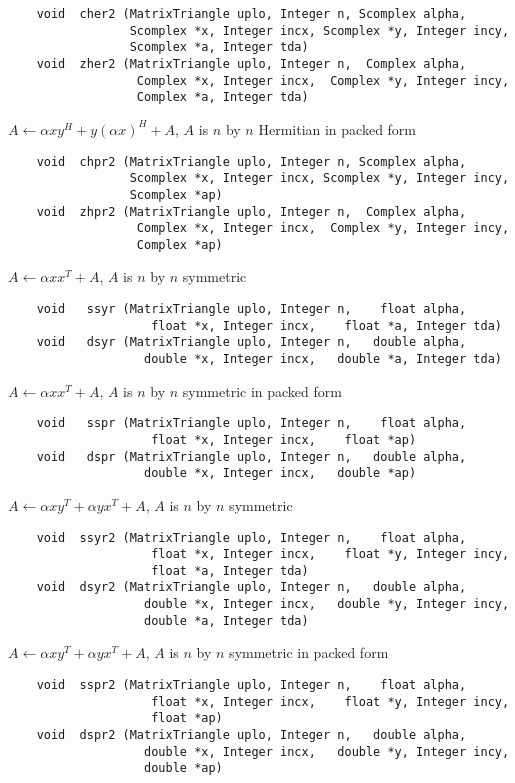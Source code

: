 \footnotesize
\begin{verbatim}
    void  cher2 (MatrixTriangle uplo, Integer n, Scomplex alpha,
                 Scomplex *x, Integer incx, Scomplex *y, Integer incy,
                 Scomplex *a, Integer tda)
    void  zher2 (MatrixTriangle uplo, Integer n,  Complex alpha,
                  Complex *x, Integer incx,  Complex *y, Integer incy,
                  Complex *a, Integer tda)
\end{verbatim}
\normalsize
$A \leftarrow \alpha xy^H + y(\alpha x)^H + A$,
$A$ is $n$ by $n$ Hermitian in packed form
\footnotesize
\begin{verbatim}
    void  chpr2 (MatrixTriangle uplo, Integer n, Scomplex alpha,
                 Scomplex *x, Integer incx, Scomplex *y, Integer incy,
                 Scomplex *ap)
    void  zhpr2 (MatrixTriangle uplo, Integer n,  Complex alpha,
                  Complex *x, Integer incx,  Complex *y, Integer incy,
                  Complex *ap)
\end{verbatim}
\normalsize
$A \leftarrow \alpha xx^T +A$, $A$ is $n$ by $n$ symmetric
\footnotesize
\begin{verbatim}
    void   ssyr (MatrixTriangle uplo, Integer n,    float alpha,
                    float *x, Integer incx,    float *a, Integer tda)
    void   dsyr (MatrixTriangle uplo, Integer n,   double alpha,
                   double *x, Integer incx,   double *a, Integer tda)
\end{verbatim}
\normalsize
$A \leftarrow \alpha xx^T + A$, $A$ is $n$ by $n$ symmetric in
packed form
\footnotesize
\begin{verbatim}
    void   sspr (MatrixTriangle uplo, Integer n,    float alpha,
                    float *x, Integer incx,    float *ap)
    void   dspr (MatrixTriangle uplo, Integer n,   double alpha,
                   double *x, Integer incx,   double *ap) 
\end{verbatim}
\normalsize
$A \leftarrow \alpha xy^T + \alpha yx^T + A$,
$A$ is $n$ by $n$ symmetric
\footnotesize
\begin{verbatim}
    void  ssyr2 (MatrixTriangle uplo, Integer n,    float alpha,
                    float *x, Integer incx,    float *y, Integer incy,
                    float *a, Integer tda)
    void  dsyr2 (MatrixTriangle uplo, Integer n,   double alpha,
                   double *x, Integer incx,   double *y, Integer incy,
                   double *a, Integer tda) 
\end{verbatim}
\normalsize
$A \leftarrow \alpha xy^T + \alpha yx^T + A$,
$A$ is $n$ by $n$ symmetric in packed form
\footnotesize
\begin{verbatim}
    void  sspr2 (MatrixTriangle uplo, Integer n,    float alpha,
                    float *x, Integer incx,    float *y, Integer incy,
                    float *ap)
    void  dspr2 (MatrixTriangle uplo, Integer n,   double alpha,
                   double *x, Integer incx,   double *y, Integer incy,
                   double *ap) 
\end{verbatim}
\normalsize

